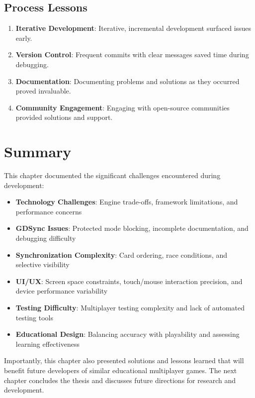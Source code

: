 \subsection{Process Lessons}
\label{subsec:process-lessons}

\begin{enumerate}
    \item \textbf{Iterative Development}: Iterative, incremental development surfaced issues early.

    \item \textbf{Version Control}: Frequent commits with clear messages saved time during debugging.

    \item \textbf{Documentation}: Documenting problems and solutions as they occurred proved invaluable.

    \item \textbf{Community Engagement}: Engaging with open-source communities provided solutions and support.
\end{enumerate}

\section{Summary}
\label{sec:problems-summary}

This chapter documented the significant challenges encountered during development:

\begin{itemize}
    \item \textbf{Technology Challenges}: Engine trade-offs, framework limitations, and performance concerns
    \item \textbf{GDSync Issues}: Protected mode blocking, incomplete documentation, and debugging difficulty
    \item \textbf{Synchronization Complexity}: Card ordering, race conditions, and selective visibility
    \item \textbf{UI/UX}: Screen space constraints, touch/mouse interaction precision, and device performance variability
    \item \textbf{Testing Difficulty}: Multiplayer testing complexity and lack of automated testing tools
    \item \textbf{Educational Design}: Balancing accuracy with playability and assessing learning effectiveness
\end{itemize}

Importantly, this chapter also presented solutions and lessons learned that will benefit future developers of similar educational multiplayer games. The next chapter concludes the thesis and discusses future directions for research and development.

